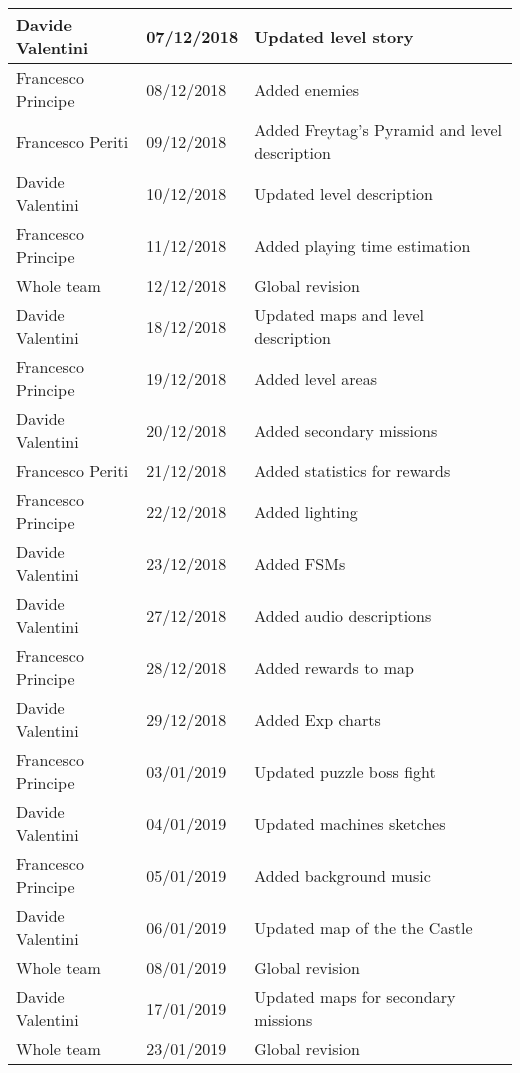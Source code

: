 \begin{longtable}[H]{|l|l|l|}
Davide Valentini & 07/12/2018 & Updated level story \\ \hline
Francesco Principe & 08/12/2018 & Added enemies \\ \hline
Francesco Periti & 09/12/2018 & Added Freytag's Pyramid and level description \\ \hline
Davide Valentini & 10/12/2018 & Updated level description \\ \hline
Francesco Principe & 11/12/2018 & Added playing time estimation \\ \hline
Whole team & 12/12/2018 & Global revision \\ \hline

Davide Valentini & 18/12/2018 & Updated maps and level description \\ \hline
Francesco Principe & 19/12/2018 & Added level areas \\ \hline
Davide Valentini & 20/12/2018 & Added secondary missions \\ \hline
Francesco Periti & 21/12/2018 & Added statistics for rewards \\ \hline
Francesco Principe & 22/12/2018 & Added lighting \\ \hline
Davide Valentini & 23/12/2018 & Added FSMs \\ \hline
Davide Valentini & 27/12/2018 & Added audio descriptions \\ \hline
Francesco Principe & 28/12/2018 & Added rewards to map \\ \hline
Davide Valentini & 29/12/2018 & Added Exp charts \\ \hline
Francesco Principe & 03/01/2019 & Updated puzzle boss fight \\ \hline
Davide Valentini & 04/01/2019 & Updated machines sketches \\ \hline
Francesco Principe & 05/01/2019 & Added background music \\ \hline
Davide Valentini & 06/01/2019 & Updated map of the the Castle \\ \hline
Whole team & 08/01/2019 & Global revision \\ \hline

Davide Valentini & 17/01/2019 & Updated maps for secondary missions \\ \hline
Whole team & 23/01/2019 & Global revision \\ \hline
\end{longtable}
